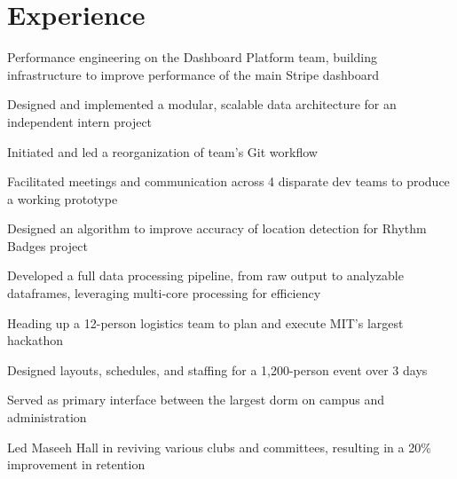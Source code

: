 \documentclass[]{deedy-resume-openfont}
\begin{document}
\section{Experience}
\hfill {}
\begin{tightemize}
	\item Performance engineering on the Dashboard Platform team, building infrastructure to improve performance of the main Stripe dashboard
\end{tightemize}
\sectionsep
{}\hfill {}
\begin{tightemize}
    \item Designed and implemented a modular, scalable data architecture for an independent intern project
    \item Initiated and led a reorganization of team's Git workflow
    \item Facilitated meetings and communication across 4 disparate dev teams to produce a working prototype
\end{tightemize}
\sectionsep
{}\hfill {}
\begin{tightemize}
	\item Designed an algorithm to improve accuracy of location detection for Rhythm Badges project
	\item Developed a full data processing pipeline, from raw output to analyzable dataframes, leveraging multi-core processing for efficiency
\end{tightemize}
\sectionsep
{}\hfill {}
\begin{tightemize}
    \item Heading up a 12-person logistics team to plan and execute MIT's largest hackathon 
    \item Designed layouts, schedules, and staffing for a 1,200-person event over 3 days
\end{tightemize}
\sectionsep
{}\hfill {}
\begin{tightemize}
    \item Served as primary interface between the largest dorm on campus and administration
    \item Led Maseeh Hall in reviving various clubs and committees, resulting in a 20\% improvement in retention
\end{tightemize}
\sectionsep
\end{document}
